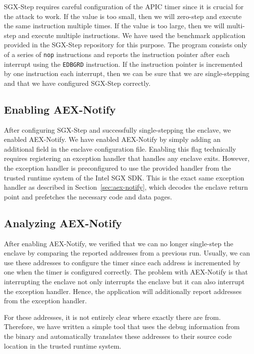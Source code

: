 \documentclass{llncs}
\begin{document}

SGX-Step requires careful configuration of the APIC timer
since it is crucial for the attack to work.
If the value is too small, then we will zero-step and execute the same instruction multiple times.
If the value is too large, then we will multi-step and execute multiple instructions.
We have used the benchmark application provided in the SGX-Step repository for this purpose.
The program consists only of a series of \texttt{nop} instructions and
reports the instruction pointer after each interrupt using the \texttt{EDBGRD} instruction.
If the instruction pointer is incremented by one instruction each interrupt,
then we can be sure that we are single-stepping and
that we have configured SGX-Step correctly.

\subsection{Enabling AEX-Notify}

After configuring SGX-Step and successfully single-stepping the enclave,
we enabled AEX-Notify.
We have enabled AEX-Notify by simply adding an additional field in the enclave configuration file.
Enabling this flag technically requires registering an exception handler that handles any enclave exits.
However, the exception handler is preconfigured to use the provided handler
from the trusted runtime system of the Intel SGX SDK.
This is the exact same exception handler as described in Section~\ref{sec:aex-notify},
which decodes the enclave return point and prefetches the necessary code and data pages.

\subsection{Analyzing AEX-Notify}

After enabling AEX-Notify, we verified that we can no longer single-step the enclave
by comparing the reported addresses from a previous run.
Usually, we can use these addresses to configure the timer
since each address is incremented by one when the timer is configured correctly.
The problem with AEX-Notify is that interrupting the enclave not only
interrupts the enclave but it can also interrupt the exception handler.
Hence, the application will additionally report addresses from the exception handler.

For these addresses, it is not entirely clear where exactly there are from.
Therefore, we have written a simple tool that uses the debug information from the binary and
automatically translates these addresses to their source code location in the trusted runtime system.
\end{document}
